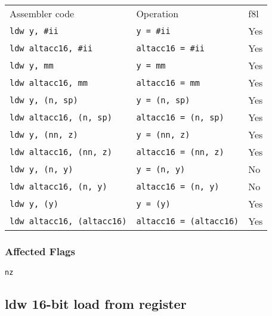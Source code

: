 \documentclass{book}
\begin{document}
\begin{tabular}{l l l}
Assembler code                    & Operation                      & f8l \\
\texttt{ldw y, \#ii}              & \texttt{y = \#ii}              & Yes \\
\texttt{ldw altacc16, \#ii}       & \texttt{altacc16 = \#ii}       & Yes \\
\texttt{ldw y, mm}                & \texttt{y = mm}                & Yes \\
\texttt{ldw altacc16, mm}         & \texttt{altacc16 = mm}         & Yes \\
\texttt{ldw y, (n, sp)}           & \texttt{y = (n, sp)}           & Yes \\
\texttt{ldw altacc16, (n, sp)}    & \texttt{altacc16 = (n, sp)}    & Yes \\
\texttt{ldw y, (nn, z)}           & \texttt{y = (nn, z)}           & Yes \\
\texttt{ldw altacc16, (nn, z)}    & \texttt{altacc16 = (nn, z)}    & Yes \\
\texttt{ldw y, (n, y)}            & \texttt{y = (n, y)}            & No \\
\texttt{ldw altacc16, (n, y)}     & \texttt{altacc16 = (n, y)}     & No \\
\texttt{ldw y, (y)}               & \texttt{y = (y)}               & Yes \\
\texttt{ldw altacc16, (altacc16)} & \texttt{altacc16 = (altacc16)} & Yes \\
\end{tabular}

\subsubsection*{Affected Flags}

\texttt{nz}


\subsection{ldw 16-bit load from register}
\end{document}
